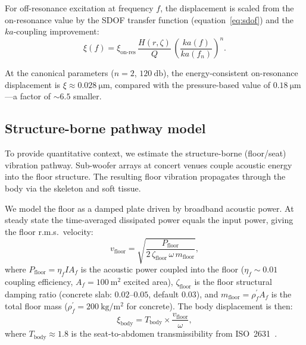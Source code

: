 For off-resonance excitation at frequency $f$, the displacement is
scaled from the on-resonance value by the SDOF transfer function
(equation~\ref{eq:sdof}) and the $ka$-coupling improvement:
%
\begin{equation}
  \xi(f) = \xi_\mathrm{on\text{-}res} \,
    \frac{H(r,\zeta)}{Q} \,
    \left(\frac{ka(f)}{ka(f_n)}\right)^n.
  \label{eq:off-resonance}
\end{equation}

At the canonical parameters ($n = 2$, $\SI{120}{\decibel}$), the
energy-consistent on-resonance displacement is
$\xi \approx \SI{0.028}{\micro\metre}$, compared with the
pressure-based value of $\SI{0.18}{\micro\metre}$---a factor of
${\sim}\num{6.5}$ smaller.

\subsection{Structure-borne pathway model}
\label{sec:floor-pathway}

To provide quantitative context, we estimate the structure-borne
(floor/seat) vibration pathway.  Sub-woofer arrays at concert venues
couple acoustic energy into the floor structure.  The resulting floor
vibration propagates through the body via the skeleton and soft tissue.

We model the floor as a damped plate driven by broadband acoustic power.
At steady state the time-averaged dissipated power equals the input
power, giving the floor r.m.s.\ velocity:
%
\begin{equation}
  v_\mathrm{floor} = \sqrt{\frac{P_\mathrm{floor}}
    {2\,\zeta_\mathrm{floor}\,\omega\,m_\mathrm{floor}}},
  \label{eq:floor-velocity}
\end{equation}
%
where $P_\mathrm{floor} = \eta_f I A_f$ is the acoustic power coupled
into the floor ($\eta_f \sim 0.01$ coupling efficiency,
$A_f = \SI{100}{\metre\squared}$ excited area),
$\zeta_\mathrm{floor}$ is the floor structural damping ratio
(concrete slab: $0.02$--$0.05$, default $0.03$), and
$m_\mathrm{floor} = \rho_f^{\prime} A_f$ is the total floor mass
($\rho_f^{\prime} = \SI{200}{\kilogram\per\metre\squared}$ for concrete).
The body displacement is then:
%
\begin{equation}
  \xi_\mathrm{body} = T_\mathrm{body} \times
    \frac{v_\mathrm{floor}}{\omega},
  \label{eq:floor-pathway}
\end{equation}
%
where $T_\mathrm{body} \approx 1.8$ is the seat-to-abdomen
transmissibility from ISO~2631~\cite{Kitazaki1998, Griffin1990}.

